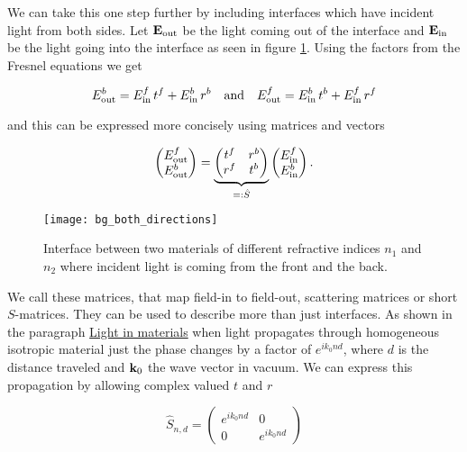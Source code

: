 We can take this one step further by including interfaces which have incident light from both sides. Let $\vb E_{\mathrm{out}}$ be the light coming out of the interface and $\vb E_{\mathrm{in}}$ be the light going into the interface as seen in figure \ref{fig:bg:both}. Using the factors from the Fresnel equations we get

\begin{equation}
    E^b_\s{out} = E^f_\s{in} \, t^f + E^b_\s{in} \, r^b
    \qq{and}
    E^f_\s{out} = E^b_\s{in} \, t^b + E^f_\s{in} \, r^f
\end{equation}
\vspace{0.5mm}

and this can be expressed more concisely using matrices and vectors

\begin{equation}
\begin{pmatrix}
    E^f_{\mathrm{out}} \\
    E^b_{\mathrm{out}}
\end{pmatrix} =
\underbrace{
\begin{pmatrix}
    t^f & r^b \\
    r^f & t^b
\end{pmatrix}
}_{
 =: \hat{S}
}
\begin{pmatrix}
    E^f_{\mathrm{in}} \\
    E^b_{\mathrm{in}}
\end{pmatrix}.
\end{equation}

\begin{figure}[H]
    \centering
    \texttt{[image: bg\_both\_directions]}
    \caption{Interface between two materials of different refractive indices $n_1$ and $n_2$ where incident light is coming from the front and the back.}
    \label{fig:bg:both}
\end{figure}

We call these matrices, that map field-in to field-out, scattering matrices or short $S$-matrices. They can be used to describe more than just interfaces. As shown in the paragraph \hyperref[par:light_in_materials]{Light in materials} when light propagates through homogeneous isotropic material just the phase changes by a factor of $e^{i k_0 n d}$, where $d$ is the distance traveled and $\vb k_0$ the wave vector in vacuum. We can express this propagation by allowing complex valued $t$ and $r$

\begin{equation}
    \hat S_{n, d} =
    \begin{pmatrix}
        e^{i k_0 n d} & 0 \\
        0 & e^{i k_0 n d}
    \end{pmatrix}
\end{equation}

